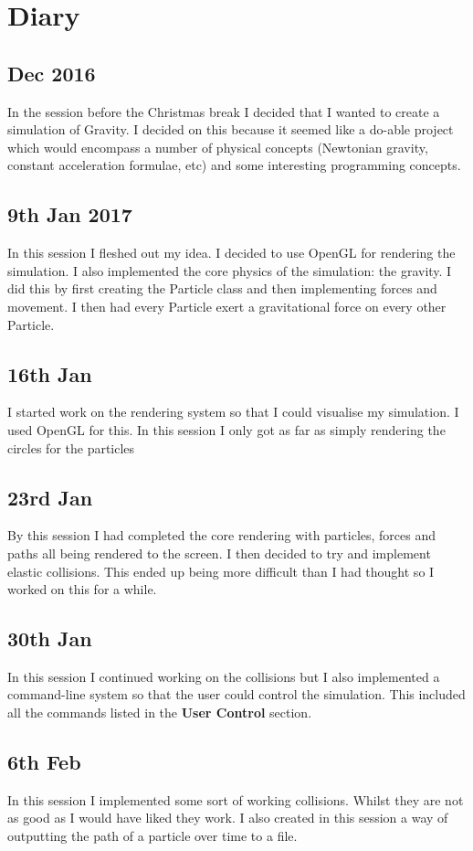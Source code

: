 \section{Diary}
	\subsection{Dec 2016}
		In the session before the Christmas break I decided that I wanted to create a simulation of Gravity. I decided on this because it seemed like a do-able project which would encompass a number of physical concepts (Newtonian gravity, constant acceleration formulae, etc) and some interesting programming concepts.
		
	\subsection{9th Jan 2017}
		In this session I fleshed out my idea. I decided to use OpenGL for rendering the simulation. I also implemented the core physics of the simulation: the gravity. I did this by first creating the Particle class and then implementing forces and movement. I then had every Particle exert a gravitational force on every other Particle.
	
	\subsection{16th Jan}
		I started work on the rendering system so that I could visualise my simulation. I used OpenGL for this. In this session I only got as far as simply rendering the circles for the particles
		
	\subsection{23rd Jan}
		By this session I had completed the core rendering with particles, forces and paths all being rendered to the screen. I then decided to try and implement elastic collisions. This ended up being more difficult than I had thought so I worked on this for a while.
	
	\subsection{30th Jan}
		In this session I continued working on the collisions but I also implemented a command-line system so that the user could control the simulation. This included all the commands listed in the \textbf{User Control} section.
	
	\subsection{6th Feb}
		In this session I implemented some sort of working collisions. Whilst they are not as good as I would have liked they work. I also created in this session a way of outputting the path of a particle over time to a  file.
